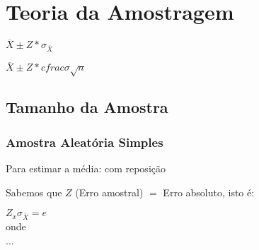 \section{Teoria da Amostragem \cite{torres}}

	$\overline{X} \pm Z * \sigma_{\overline{X}}$
	
	$\overline{X} \pm Z * cfrac{\sigma}{\sqrt{n}}$

	\subsection{Tamanho da Amostra}
	
	    \subsubsection{Amostra Aleatória Simples}
	    
	    Para estimar a média: com reposição
	    
	    Sabemos que $ Z $ (Erro amostral) $ = $ Erro absoluto, isto é:
	    
	    $Z_{x} \sigma_{\overline{X}} = e$ \\ onde \\ 
	    
	    ...
	    
	    
	
	    